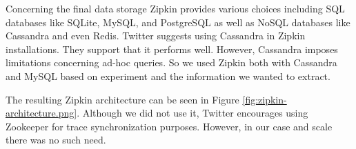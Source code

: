 
Concerning the final data storage Zipkin provides various choices including SQL
databases like SQLite, MySQL, and PostgreSQL as well as NoSQL databases like
Cassandra and even Redis. Twitter suggests using Cassandra in Zipkin
installations. They support that it performs well. However, Cassandra imposes
limitations concerning ad-hoc queries. So we used Zipkin both with Cassandra and
MySQL based on experiment and the information we wanted to extract.

The resulting Zipkin architecture can be seen in Figure
\ref{fig:zipkin-architecture.png}. Although we did not use it, Twitter
encourages using Zookeeper for trace synchronization purposes. However, in our
case and scale there was no such need.
